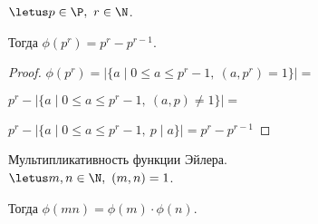 \begin{theorem-non}
    $\letus p \in \P,~r \in \N$.

    Тогда $\phi(p^r) = p^r - p^{r-1}$.
\end{theorem-non}

\begin{proof}
    $\phi(p^r) = |\{a \mid 0 \leq a \leq p^r-1,~(a, p^r) = 1\}| = $

    $p^r -  |\{a \mid 0 \leq a \leq p^r-1,~(a, p) \neq 1\}| = $
    
    $p^r - |\{a \mid 0 \leq a \leq p^r-1,~p \mid a\}| = p^r - p^{r-1}$
\end{proof}

\begin{theorem-non} Мультипликативность функции Эйлера. \\
    $\letus m, n \in \N,~(m, n) = 1$.

    Тогда $\phi(mn) = \phi(m) \cdot \phi(n)$.
\end{theorem-non}

